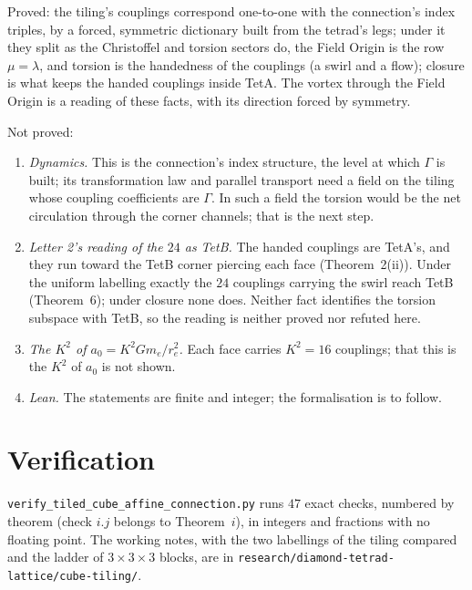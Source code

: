 \documentclass[twocolumn]{iopjournal}
\begin{document}
Proved: the tiling's couplings correspond one-to-one with the
connection's index triples, by a forced, symmetric dictionary built
from the tetrad's legs; under it they split as the Christoffel and
torsion sectors do, the Field Origin is the row $\mu = \lambda$, and
torsion is the handedness of the couplings (a swirl and a flow);
closure is what keeps the handed couplings inside TetA. The vortex
through the Field Origin is a reading of these facts, with its
direction forced by symmetry.

Not proved:
\begin{enumerate}
\item \emph{Dynamics.} This is the connection's index structure,
  the level at which $\Gamma$ is built; its transformation law and
  parallel transport need a field on the tiling whose coupling
  coefficients are $\Gamma$. In such a field the torsion would be the
  net circulation through the corner channels; that is the next
  step.
\item \emph{Letter 2's reading of the $24$ as TetB.} The handed
  couplings are TetA's, and they run toward the TetB corner piercing
  each face (Theorem~2(ii)). Under the uniform labelling exactly the
  $24$ couplings carrying the swirl reach TetB (Theorem~6); under
  closure none does. Neither fact identifies the torsion subspace
  with TetB, so the reading is neither proved nor refuted here.
\item \emph{The $K^2$ of $a_0 = K^2Gm_e/r_e^2$.} Each face carries
  $K^2 = 16$ couplings; that this is the $K^2$ of $a_0$ is not shown.
\item \emph{Lean.} The statements are finite and integer; the
  formalisation is to follow.
\end{enumerate}


\section*{Verification}

\texttt{verify\_tiled\_cube\_affine\_connection.py} runs $47$ exact
checks, numbered by theorem (check $i.j$ belongs to Theorem~$i$), in
integers and fractions with no floating point. The working notes,
with the two labellings of the tiling compared and the ladder of
$3 \times 3 \times 3$ blocks, are in
\texttt{research/diamond-tetrad-lattice/}\allowbreak\texttt{cube-tiling/}.

\end{document}
